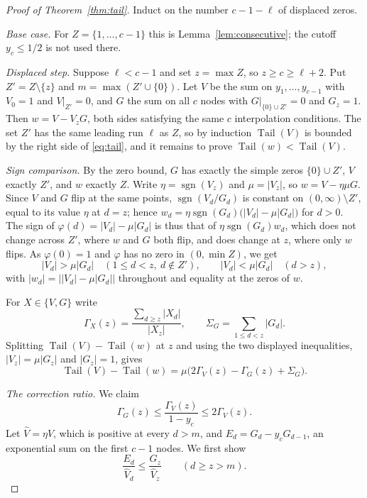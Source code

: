 \documentclass[11pt]{article}
\DeclareMathOperator{\Tail}{Tail}
\DeclareMathOperator{\sgn}{sgn}
\begin{document}
\begin{proof}[Proof of Theorem~\ref{thm:tail}]
Induct on the number $c-1-\ell$ of displaced zeros.

\emph{Base case.}  For $Z=\{1,\ldots,c-1\}$ this is
Lemma~\ref{lem:consecutive}; the cutoff $y_c\le1/2$ is not used there.

\emph{Displaced step.}  Suppose $\ell<c-1$ and set $z=\max Z$, so
$z\ge c\ge\ell+2$.  Put $Z'=Z\setminus\{z\}$ and $m=\max(Z'\cup\{0\})$.  Let
$V$ be the sum on $y_1,\ldots,y_{c-1}$ with $V_0=1$ and $V|_{Z'}=0$, and $G$
the sum on all $c$ nodes with $G|_{\{0\}\cup Z'}=0$ and $G_z=1$.  Then
$w=V-V_zG$, both sides satisfying the same $c$ interpolation conditions.
The set $Z'$ has the same leading run $\ell$ as $Z$, so by induction
$\Tail(V)$ is bounded by the right side of \eqref{eq:tail}, and it remains
to prove $\Tail(w)<\Tail(V)$.

\emph{Sign comparison.}  By the zero bound, $G$ has exactly the simple zeros
$\{0\}\cup Z'$, $V$ exactly $Z'$, and $w$ exactly $Z$.  Write
$\eta=\sgn(V_z)$ and $\mu=|V_z|$, so $w=V-\eta\mu G$.  Since $V$ and $G$ flip
at the same points, $\sgn(V_d/G_d)$ is constant on $(0,\infty)\setminus Z'$,
equal to its value $\eta$ at $d=z$; hence
$w_d=\eta\sgn(G_d)\bigl(|V_d|-\mu|G_d|\bigr)$ for $d>0$.  The sign of
$\varphi(d)=|V_d|-\mu|G_d|$ is thus that of $\eta\sgn(G_d)w_d$, which does
not change across $Z'$, where $w$ and $G$ both flip, and does change at $z$,
where only $w$ flips.  As $\varphi(0)=1$ and $\varphi$ has no zero in
$(0,\min Z)$, we get
\[
  |V_d|>\mu|G_d|\quad(1\le d<z,\ d\notin Z'),
  \qquad
  |V_d|<\mu|G_d|\quad(d>z),
\]
with $|w_d|=\bigl||V_d|-\mu|G_d|\bigr|$ throughout and equality at the
zeros of $w$.

For $X\in\{V,G\}$ write
\[
  \Gamma_X(z)=\frac{\sum_{d\ge z}|X_d|}{|X_z|},
  \qquad \Sigma_G=\sum_{1\le d<z}|G_d|.
\]
Splitting $\Tail(V)-\Tail(w)$ at $z$ and using the two displayed
inequalities, $|V_z|=\mu|G_z|$ and $|G_z|=1$, gives
\begin{equation}\label{eq:split}
  \Tail(V)-\Tail(w)
  =\mu\bigl(2\Gamma_V(z)-\Gamma_G(z)+\Sigma_G\bigr).
\end{equation}

\emph{The correction ratio.}  We claim
\begin{equation}\label{eq:gamma}
  \Gamma_G(z)\le\frac{\Gamma_V(z)}{1-y_c}\le2\Gamma_V(z).
\end{equation}
Let $\widehat V=\eta V$, which is positive at every $d>m$, and
$E_d=G_d-y_cG_{d-1}$, an exponential sum on the first $c-1$ nodes.  We first
show
\begin{equation}\label{eq:drive}
  \frac{E_d}{\widehat V_d}\le
  \frac{G_z}{\widehat V_z}\qquad(d\ge z>m).
\end{equation}


\end{proof}
\end{document}

